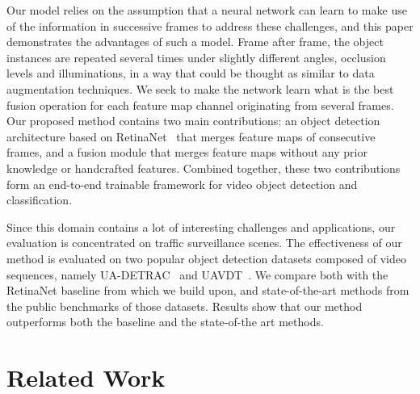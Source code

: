 \documentclass[runningheads]{llncs}
\begin{document}
Our model relies on the assumption that a neural network can learn to make use of the information in successive frames to address these challenges, and this paper demonstrates the advantages of such a model. Frame after frame, the object instances are repeated several times under slightly different angles, occlusion levels and illuminations, in a way that could be thought as similar to data augmentation techniques. We seek to make the network learn what is the best fusion operation for each feature map channel originating from several frames. Our proposed method contains two main contributions: an object detection architecture based on RetinaNet~\cite{lin2018focal} that merges feature maps of consecutive frames, and a fusion module that merges feature maps without any prior knowledge or handcrafted features. Combined together, these two contributions form an end-to-end trainable framework for video object detection and classification. 

Since this domain contains a lot of interesting challenges and applications, our evaluation is concentrated on traffic surveillance scenes. The effectiveness of our method is evaluated on two popular object detection datasets composed of video sequences, namely UA-DETRAC~\cite{Wen2015Tracking} and UAVDT~\cite{du2018unmanned}. We compare both with the RetinaNet baseline from which we build upon, and state-of-the-art methods from the public benchmarks of those datasets. Results show that our method outperforms both the baseline and the state-of-the art methods.  

\section{Related Work}
\end{document}
